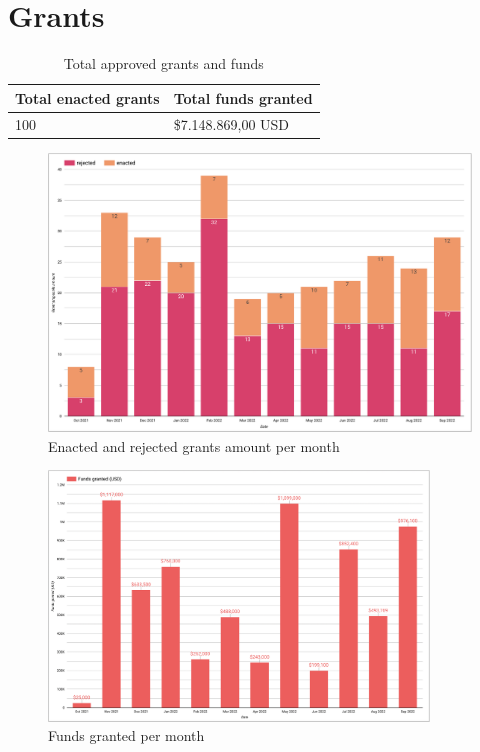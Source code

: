 \documentclass[MSE,Master,english]{twbook}%
\begin{document}
\section{Grants}
\begin{center}
  \begin{table}[H]
    \begin{tabular}{ | m{20em} | m{20em} | }
      \hline
      \textbf{Total enacted grants} & \textbf{Total funds granted} \\
      \hline
      100 & \$7.148.869,00 USD \\
      \hline
    \end{tabular}
    \caption{Total approved grants and funds}
    \label{table:grants}
  \end{table}
\end{center}
\begin{figure}[H]
  \centering
  \includegraphics[width=\textwidth]{metrics/grants_amount.png}
  \caption{Enacted and rejected grants amount per month}
  \label{fig:grants_amount}
\end{figure}
\begin{figure}[H]
  \centering
  \includegraphics[width=0.9\textwidth]{metrics/funds_granted.png}
  \caption{Funds granted per month}
  \label{fig:funds_granted}
\end{figure}
\end{document}
